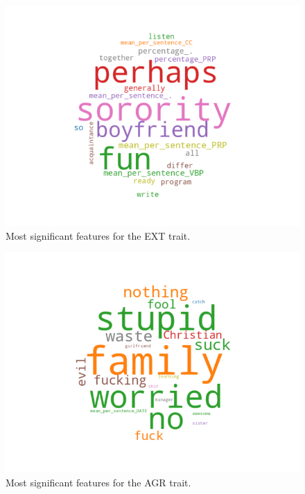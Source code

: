 \documentclass[10pt, a4paper]{article}
\begin{document}
\begin{figure}
\begin{center}
  \includegraphics[width=\columnwidth]{figures/cEXT.png}
  \caption{Most significant features for the EXT trait.}
  \label{fig:figure1}
\end{center}
\end{figure}

\begin{figure}
\begin{center}
  \includegraphics[width=\columnwidth]{figures/cAGR.png}
  \caption{Most significant features for the AGR trait.}
  \label{fig:figure2}
\end{center}
\end{figure}
\end{document}
